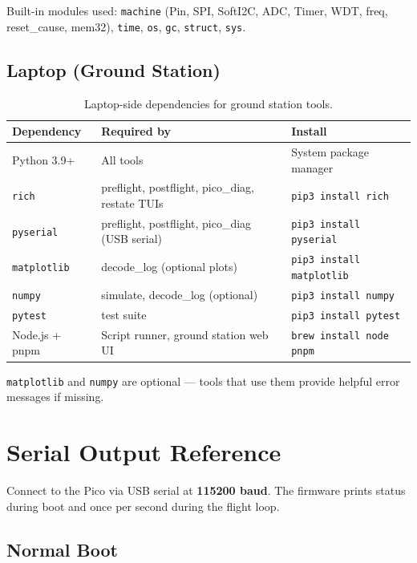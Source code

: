 \documentclass[11pt, a4paper, twoside]{article}
\begin{document}
Built-in modules used: \texttt{machine} (Pin, SPI, SoftI2C, ADC, Timer, WDT, freq, reset\_cause, mem32), \texttt{time}, \texttt{os}, \texttt{gc}, \texttt{struct}, \texttt{sys}.

\subsection{Laptop (Ground Station)}

\begin{table}[ht]
\centering
\caption{Laptop-side dependencies for ground station tools.}
\label{tab:laptop-deps}
\begin{tabularx}{\textwidth}{l l X}
\toprule
\textbf{Dependency} & \textbf{Required by} & \textbf{Install} \\
\midrule
Python 3.9+ & All tools & System package manager \\
\texttt{rich} & preflight, postflight, pico\_diag, restate TUIs & \texttt{pip3 install rich} \\
\texttt{pyserial} & preflight, postflight, pico\_diag (USB serial) & \texttt{pip3 install pyserial} \\
\texttt{matplotlib} & decode\_log (optional plots) & \texttt{pip3 install matplotlib} \\
\texttt{numpy} & simulate, decode\_log (optional) & \texttt{pip3 install numpy} \\
\texttt{pytest} & test suite & \texttt{pip3 install pytest} \\
Node.js + pnpm & Script runner, ground station web UI & \texttt{brew install node pnpm} \\
\bottomrule
\end{tabularx}
\end{table}

\texttt{matplotlib} and \texttt{numpy} are optional --- tools that use them provide helpful error messages if missing.

\section{Serial Output Reference}
\label{sec:serial-output}

Connect to the Pico via USB serial at \textbf{115200 baud}. The firmware prints status during boot and once per second during the flight loop.

\subsection{Normal Boot}
\end{document}
